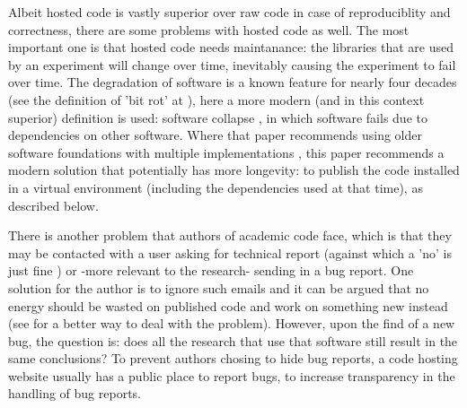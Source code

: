 Albeit hosted code is vastly superior over raw code
in case of reproduciblity and correctness,
there are some problems with hosted code as well.
The most important one is that hosted code needs maintanance:
the libraries that are used by an experiment
will change over time, inevitably causing the experiment to fail
over time. 
The degradation of software is a known feature for nearly 
four decades (see the definition of 'bit rot' at \cite{steele1983hacker}),
here a more modern (and in this context superior)
definition is used: software collapse \cite{hinsen2019dealing},
in which software fails due to dependencies on other 
software.
Where that paper recommends using older software foundations 
with multiple implementations \cite{hinsen2019dealing},
this paper recommends a modern solution that potentially has more longevity:
to publish the code installed in a virtual environment
(including the dependencies used at that time), as described below.

There is another problem that authors of academic code face,
which is that they may be contacted with a user 
asking for technical report 
(against which a 'no' is just fine \cite{barnes2010publish})
or -more relevant to the research- sending in a bug report.
One solution for the author is to ignore such emails
and it can be argued that no energy should be wasted on published code
and work on something new instead 
(see \cite{barnes2010publish} for a better way to deal with the problem).
However, upon the find of a new bug, the question is:
does all the research that use that software still 
result in the same conclusions?
To prevent authors chosing to hide bug reports, 
a code hosting website usually has a public place to report bugs,
to increase transparency in the handling of bug reports.

